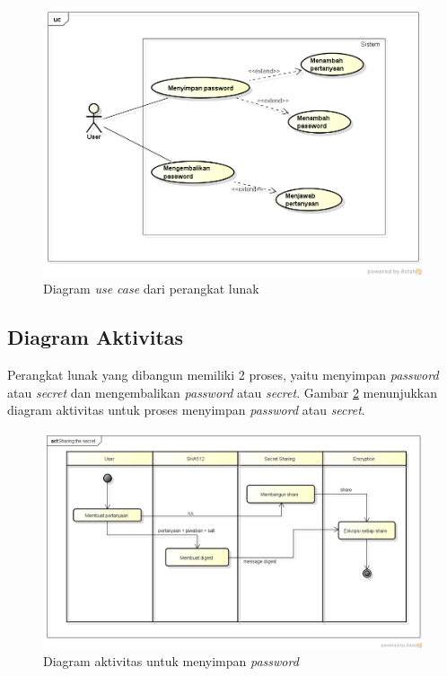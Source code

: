 \begin{figure}[H]
	\centerline{\includegraphics[scale=0.4]{Gambar/use_case}}
	\caption{Diagram \textit{use case} dari perangkat lunak}\label{fig:use_case}
\end{figure}

\subsection{Diagram Aktivitas}

Perangkat lunak yang dibangun memiliki 2 proses, yaitu menyimpan \textit{password} atau \textit{secret} dan mengembalikan \textit{password} atau \textit{secret}. Gambar \ref{fig:sharing-secret} menunjukkan diagram aktivitas untuk proses menyimpan \textit{password} atau \textit{secret}.

\begin{figure}[H]
	\centerline{\includegraphics[scale=0.4]{Gambar/sharing-secret}}
	\caption{Diagram aktivitas untuk menyimpan \textit{password}}\label{fig:sharing-secret}
\end{figure}

